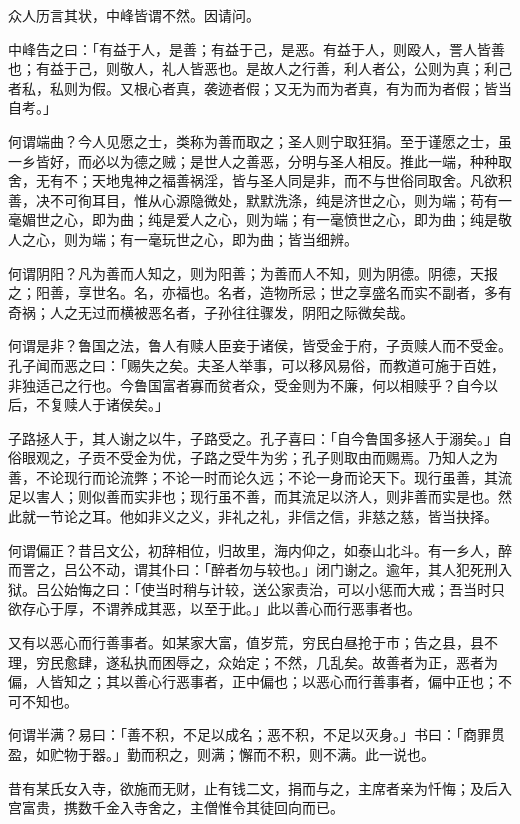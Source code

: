 \documentclass[12pt,twoside,openany]{book}
\begin{document}
众人历言其状，中峰皆谓不然。因请问。

中峰告之曰：「有益于人，是善；有益于己，是恶。有益于人，则殴人，詈人皆善也；有益于己，则敬人，礼人皆恶也。是故人之行善，利人者公，公则为真；利己者私，私则为假。又根心者真，袭迹者假；又无为而为者真，有为而为者假；皆当自考。」

何谓端曲？今人见愿之士，类称为善而取之；圣人则宁取狂狷。至于谨愿之士，虽一乡皆好，而必以为德之贼；是世人之善恶，分明与圣人相反。推此一端，种种取舍，无有不；天地鬼神之福善祸淫，皆与圣人同是非，而不与世俗同取舍。凡欲积善，决不可徇耳目，惟从心源隐微处，默默洗涤，纯是济世之心，则为端；苟有一毫媚世之心，即为曲；纯是爱人之心，则为端；有一毫愤世之心，即为曲；纯是敬人之心，则为端；有一毫玩世之心，即为曲；皆当细辨。

何谓阴阳？凡为善而人知之，则为阳善；为善而人不知，则为阴德。阴德，天报之；阳善，享世名。名，亦福也。名者，造物所忌；世之享盛名而实不副者，多有奇祸；人之无过而横被恶名者，子孙往往骤发，阴阳之际微矣哉。

何谓是非？鲁国之法，鲁人有赎人臣妾于诸侯，皆受金于府，子贡赎人而不受金。孔子闻而恶之曰：「赐失之矣。夫圣人举事，可以移风易俗，而教道可施于百姓，非独适己之行也。今鲁国富者寡而贫者众，受金则为不廉，何以相赎乎？自今以后，不复赎人于诸侯矣。」

子路拯人于，其人谢之以牛，子路受之。孔子喜曰：「自今鲁国多拯人于溺矣。」自俗眼观之，子贡不受金为优，子路之受牛为劣；孔子则取由而赐焉。乃知人之为善，不论现行而论流弊；不论一时而论久远；不论一身而论天下。现行虽善，其流足以害人；则似善而实非也；现行虽不善，而其流足以济人，则非善而实是也。然此就一节论之耳。他如非义之义，非礼之礼，非信之信，非慈之慈，皆当抉择。

何谓偏正？昔吕文公，初辞相位，归故里，海内仰之，如泰山北斗。有一乡人，醉而詈之，吕公不动，谓其仆曰：「醉者勿与较也。」闭门谢之。逾年，其人犯死刑入狱。吕公始悔之曰：「使当时稍与计较，送公家责治，可以小惩而大戒；吾当时只欲存心于厚，不谓养成其恶，以至于此。」此以善心而行恶事者也。

又有以恶心而行善事者。如某家大富，值岁荒，穷民白昼抢于市；告之县，县不理，穷民愈肆，遂私执而困辱之，众始定；不然，几乱矣。故善者为正，恶者为偏，人皆知之；其以善心行恶事者，正中偏也；以恶心而行善事者，偏中正也；不可不知也。

何谓半满？易曰：「善不积，不足以成名；恶不积，不足以灭身。」书曰：「商罪贯盈，如贮物于器。」勤而积之，则满；懈而不积，则不满。此一说也。

昔有某氏女入寺，欲施而无财，止有钱二文，捐而与之，主席者亲为忏悔；及后入宫富贵，携数千金入寺舍之，主僧惟令其徒回向而已。
\end{document}
